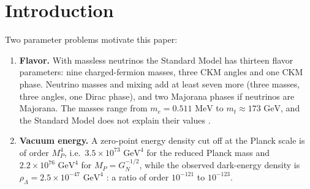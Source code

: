 \documentclass[11pt,reqno]{amsart}
\theoremstyle{definition}
\begin{document}
\maketitle

\tableofcontents

\newpage

\section{Introduction}

Two parameter problems motivate this paper:
\begin{enumerate}
    \item \textbf{Flavor.} With massless neutrinos the Standard Model has thirteen flavor parameters: nine charged-fermion masses, three CKM angles and one CKM phase. Neutrino masses and mixing add at least seven more (three masses, three angles, one Dirac phase), and two Majorana phases if neutrinos are Majorana. The masses range from $m_e = 0.511\text{ MeV}$ to $m_t \approx 173\text{ GeV}$, and the Standard Model does not explain their values \cite{weinberg1967model,kobayashi1973cp,pdg2024}.
    \item \textbf{Vacuum energy.} A zero-point energy density cut off at the Planck scale is of order $M_P^4$, i.e.\ $3.5\times10^{73}\text{ GeV}^4$ for the reduced Planck mass and $2.2\times10^{76}\text{ GeV}^4$ for $M_P = G_N^{-1/2}$, while the observed dark-energy density is $\rho_\Lambda = 2.5\times10^{-47}\text{ GeV}^4$ \cite{weinberg1989cosmological,planck2018}: a ratio of order $10^{-121}$ to $10^{-123}$.
\end{enumerate}
\end{document}
